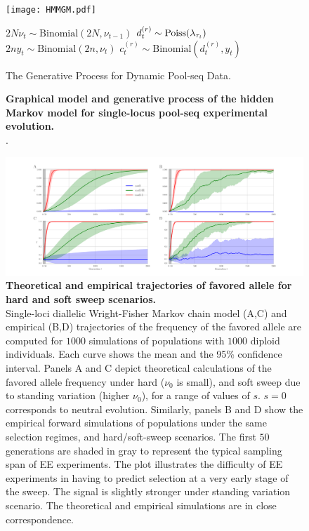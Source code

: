 \begin{figure}[H]
	\centering
	\texttt{[image: HMMGM.pdf]}
 \begin{algorithm}[H]
 	\DontPrintSemicolon
 	\SetAlgoNoLine
 	{
 		{
 			$2N\nu_t \sim \text{Binomial}({2N},{\nu_{t-1}})$\;
 			{
 				$d^{(r)}_{t} \sim \operatorname{Poiss}(\lambda_{\tau_i})$ \;
 				$2ny_t \sim \text{Binomial}({2n},{\nu_{t}})$\;  
 				$c^{(r)}_{t} \sim \text{Binomial}(d^{(r)}_{t},{y_{t}})$\; 
 			}
 		}
 	}
 	\caption{The Generative Process for Dynamic Pool-seq Data.} 
 	\label{proc:arya}
 \end{algorithm}	
	\caption{{\bf Graphical model and generative process of the hidden Markov 
	model for single-locus pool-seq experimental evolution.}\\ . }
 	\label{fig:GM}
\end{figure} 

\begin{figure}[H]
	\includegraphics[trim=0in 0.in 0in 
	0.1in,clip,width=\textwidth]{AF.pdf}
	\caption{{\bf Theoretical and empirical
			trajectories of favored allele for hard and soft sweep
			scenarios.}\\  Single-loci diallelic Wright-Fisher Markov chain 
			model (A,C) and empirical (B,D) trajectories 
		of 
		the
		frequency of the favored allele are computed for $1000$ 
		simulations of populations with 
		$1000$ diploid individuals. Each curve shows the mean and the 95\% 
		confidence
		interval. Panels A and C depict theoretical calculations of the favored 
		allele frequency under
		hard ($\nu_0$ is small), and soft sweep due to standing
		variation (higher $\nu_0$), for a range of values of
		$s$. $s=0$ corresponds to neutral
		evolution. Similarly, panels B and D show the empirical
		forward simulations of populations under the same selection
		regimes, and hard/soft-sweep scenarios. The first $50$
		generations are shaded in gray to represent the typical
		sampling span of EE experiments. The plot illustrates the
		difficulty of EE experiments in having to predict selection
		at a very early stage of the sweep. The signal is slightly
		stronger under standing variation scenario. The theoretical
		and empirical simulations are in close correspondence. }
	\label{fig:sweep}
\end{figure}


